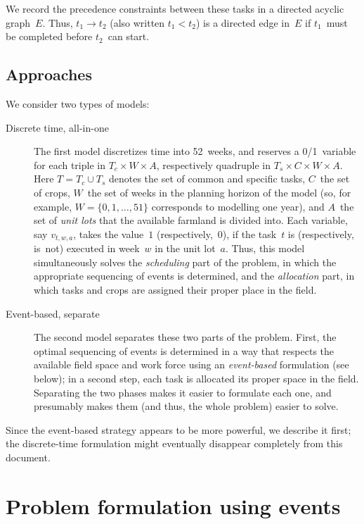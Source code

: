 \documentclass[11pt]{amsart}
\numberwithin{equation}{section}
\begin{document}
We record the precedence constraints between these tasks in a directed
acyclic graph~$E$. Thus, $t_1\longrightarrow t_2$ (also written
$t_1<t_2$) is a directed edge in~$E$ if $t_1$~must be completed
before $t_2$~can start.

\subsection{Approaches}

We consider two types of models:

\begin{description}
\item[Discrete time, all-in-one] The first model discretizes time into
  52~weeks, and reserves a 0/1~variable for each triple in $T_c\times
  W\times A$, respectively quadruple in $T_s\times C\times W\times
  A$. Here $T=T_c\cup T_s$ denotes the set of common and specific
  tasks, $C$~the set of crops, $W$~the set of weeks in the planning
  horizon of the model (so, for example, $W=\{0,1,\dots,51\}$
  corresponds to modelling one year), and $A$~the set of \emph{unit
    lots} that the available farmland is divided into.  Each variable,
  say $v_{t,w,a}$, takes the value~$1$ (respectively,~$0$), if the
  task~$t$ is (respectively, is~not) executed in week~$w$ in the unit
  lot~$a$. Thus, this model simultaneously solves the
  \emph{scheduling} part of the problem, in which the appropriate
  sequencing of events is determined, and the \emph{allocation} part,
  in which tasks and crops are assigned their proper place in the
  field.

\item[Event-based, separate] The second model separates these two
  parts of the problem. First, the optimal sequencing of events is
  determined in a way that respects the available field space and work
  force using an \emph{event-based} formulation (see below); in a
  second step, each task is allocated its proper space in the
  field. Separating the two phases makes it easier to formulate each
  one, and presumably makes them (and thus, the whole problem) easier
  to solve.
\end{description}

Since the event-based strategy appears to be more powerful, we
describe it first; the discrete-time formulation might eventually
disappear completely from this document.

\section{Problem formulation using events}
\end{document}
